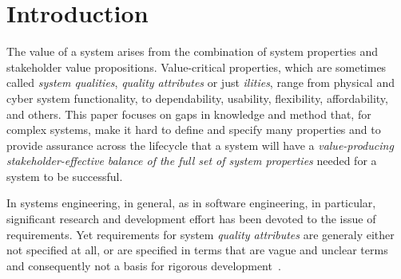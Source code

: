 \documentclass[conference]{IEEEtran}
\begin{document}
\IEEEpeerreviewmaketitle



\section{Introduction}
The value of a system arises from the combination of system properties and stakeholder value propositions. Value-critical properties, which are sometimes called {\em system qualities}, {\em quality attributes} or just {\em ilities}, range from physical and cyber system functionality, to dependability, usability, flexibility, affordability, and others. This paper focuses on gaps in knowledge and method that, for complex systems, make it hard to define and specify many properties and to provide assurance across the lifecycle that a system will have a  {\em value-producing stakeholder-effective balance of the full set of system properties} needed for a system to be successful. 

In systems engineering, in general, as in software engineering, in particular, significant research and development effort has been devoted to the issue of requirements. Yet requirements for system {\em quality attributes} are generaly either not specified at all, or are specified in terms that are vague and unclear terms and consequently not a basis for rigorous development~\cite{bosch-isa99}. 
\end{document}
